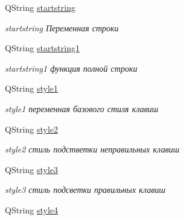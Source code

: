 \begin{DoxyCompactItemize}
\mbox{\label{class_main_window_a6978001c83359ab9b7cae9a225741d42}} 
Q\+String \mbox{\hyperlink{class_main_window_a6978001c83359ab9b7cae9a225741d42}{startstring}}
\begin{DoxyCompactList}\small\item\em startstring Переменная строки \end{DoxyCompactList}\item 
\mbox{\label{class_main_window_a46291f8d78c80c211d02caad081ccb87}} 
Q\+String \mbox{\hyperlink{class_main_window_a46291f8d78c80c211d02caad081ccb87}{startstring1}}
\begin{DoxyCompactList}\small\item\em startstring1 функция полной строки \end{DoxyCompactList}\item 
\mbox{\label{class_main_window_a6614c564c3a9a19c5fcf3bca66f31353}} 
Q\+String \mbox{\hyperlink{class_main_window_a6614c564c3a9a19c5fcf3bca66f31353}{style1}}
\begin{DoxyCompactList}\small\item\em style1 переменная базового стиля клавиш \end{DoxyCompactList}\item 
\mbox{\label{class_main_window_ab6ffa9ab5dd5d7bdf4248e997b68b279}} 
Q\+String \mbox{\hyperlink{class_main_window_ab6ffa9ab5dd5d7bdf4248e997b68b279}{style2}}
\begin{DoxyCompactList}\small\item\em style2 стиль подстветки неправильных клавиш \end{DoxyCompactList}\item 
\mbox{\label{class_main_window_a0c90d5ad725a17241d14ee0ad80564b7}} 
Q\+String \mbox{\hyperlink{class_main_window_a0c90d5ad725a17241d14ee0ad80564b7}{style3}}
\begin{DoxyCompactList}\small\item\em style3 стиль подсветки правильных клавиш \end{DoxyCompactList}\item 
\mbox{\label{class_main_window_ac5b556ba901ca7db8cca0c1af1ff1fa1}} 
Q\+String \mbox{\hyperlink{class_main_window_ac5b556ba901ca7db8cca0c1af1ff1fa1}{style4}}

\end{DoxyCompactItemize}
